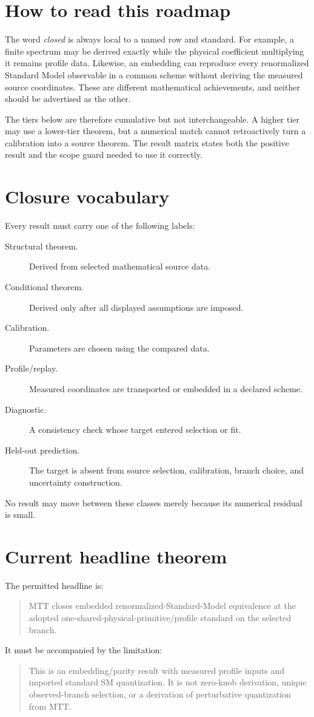 \documentclass[11pt]{article}
\begin{document}
\section{How to read this roadmap}

The word \emph{closed} is always local to a named row and standard. For
example, a finite spectrum may be derived exactly while the physical
coefficient multiplying it remains profile data. Likewise, an embedding can
reproduce every renormalized Standard Model observable in a common scheme
without deriving the measured source coordinates. These are different
mathematical achievements, and neither should be advertised as the other.

The tiers below are therefore cumulative but not interchangeable. A higher
tier may use a lower-tier theorem, but a numerical match cannot retroactively
turn a calibration into a source theorem. The result matrix states both the
positive result and the scope guard needed to use it correctly.

\section{Closure vocabulary}

Every result must carry one of the following labels:
\begin{description}
\item[Structural theorem.] Derived from selected mathematical source data.
\item[Conditional theorem.] Derived only after all displayed assumptions are
imposed.
\item[Calibration.] Parameters are chosen using the compared data.
\item[Profile/replay.] Measured coordinates are transported or embedded in a
declared scheme.
\item[Diagnostic.] A consistency check whose target entered selection or fit.
\item[Held-out prediction.] The target is absent from source selection,
calibration, branch choice, and uncertainty construction.
\end{description}
No result may move between these classes merely because its numerical residual
is small.

\section{Current headline theorem}

The permitted headline is:
\begin{quote}
MTT closes embedded renormalized-Standard-Model equivalence at the adopted
one-shared-physical-primitive/profile standard on the selected branch.
\end{quote}
It must be accompanied by the limitation:
\begin{quote}
This is an embedding/parity result with measured profile inputs and imported
standard SM quantization. It is not zero-knob derivation, unique observed-branch
selection, or a derivation of perturbative quantization from MTT.
\end{quote}
\end{document}
